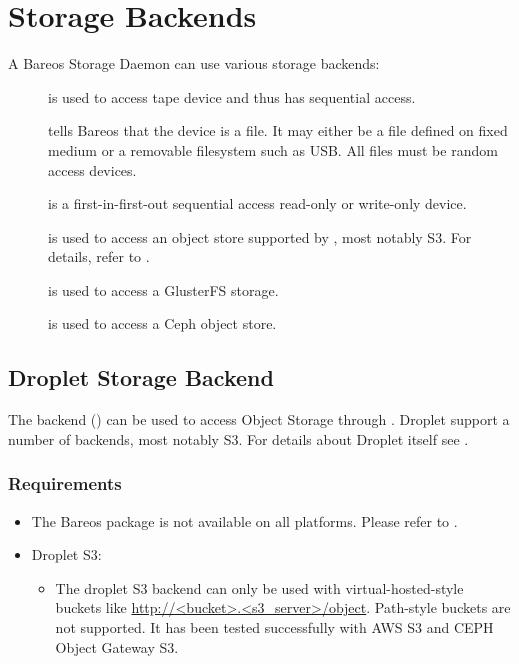 \chapter{Storage Backends}

A Bareos Storage Daemon can use various storage backends:

\begin{description}
\item [] is used to access tape device and thus has sequential access.
\item []
  tells Bareos that the device is a file. It may either be a
  file defined on fixed medium or a removable filesystem such as
  USB.  All files must be random access devices.
\item [] is a first-in-first-out sequential access read-only
  or write-only device.
\item [] is used to access an object store supported by , most notably S3.
  For details, refer to .
\item [] is used to access a GlusterFS storage.
\item [] is used to access a Ceph object store.
\end{description}



\section{Droplet Storage Backend}
\label{SdBackendDroplet}

The  backend () can be used to access Object Storage through .
Droplet support a number of backends, most notably S3.
For details about Droplet itself see \externalReferenceDroplet.

\subsection{Requirements}

\begin{itemize}
  \item The Bareos package  is not available on all platforms. Please refer to .
  \item Droplet S3:
  \begin{itemize}
    \item The droplet S3 backend can only be used with virtual-hosted-style buckets like \url{http://<bucket>.<s3_server>/object}.
        Path-style buckets are not supported.
        It has  been tested successfully with AWS S3 and CEPH Object Gateway S3.
  \end{itemize}
\end{itemize}


